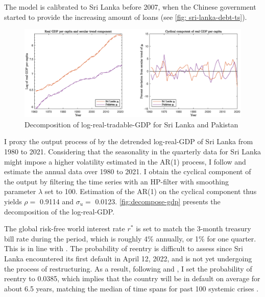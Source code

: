 The model is calibrated to Sri Lanka before 2007, when the Chinese government started to provide the increasing amount of loans (see \autoref{fig: sri-lanka-debt-ts}).
\begin{figure}[t]
    \includegraphics[width = \textwidth]{fig/decompose_gdp.eps}
    \caption{Decomposition of log-real-tradable-GDP for Sri Lanka and Pakistan}
    \label{fig:decompose-gdp}
\end{figure}

I proxy the output process of  by the detrended log-real-GDP of Sri Lanka from 1980 to 2021. Considering that the seasonality in the quarterly data for Sri Lanka might impose a higher volatility estimated in the AR(1) process, I follow \citet{Hinrichsen_2020-chapter4} and estimate the annual data over 1980 to 2021. I obtain the cyclical component of the output by filtering the time series with an HP-filter with smoothing parameter $\lambda$ set to 100.
Estimation of the AR(1) on the cyclical component thus yields $\rho = $ 0.9114 and $\sigma_u = $ 0.0123\footnotemark{}. \autoref{fig:decompose-gdp} presents the decomposition of the log-real-GDP.

The global risk-free world interest rate $r^*$ is set to match the 3-month treasury bill rate during the period, which is roughly 4\% annually, or 1\% for one quarter. This is in line with \citet{Chatterjee-12}.
The probability of reentry is difficult to assess since Sri Lanka encountered its first default in April 12, 2022, and is not yet undergoing the process of restructuring. As a result, following \citet*{Chatterjee-12} and \citet*{Hinrichsen_2020-chapter4}, I set the probability of reentry to 0.0385, which implies that the country will be in default on average for about 6.5 years, matching the median of time spans for past 100 systemic crises \citep*{Reinhart-Rogoff-2014-100-episode}.

